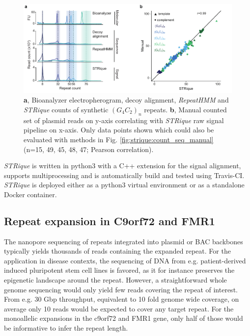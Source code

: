 \begin{figure}[h]
	\centering
	\includegraphics[width=1.0\textwidth]{figures/strique/count_signal_corr.pdf}
	\captionsetup{format=plain}
	\caption[Molecular, sequence and signal based STR evaluation]{\textbf{a}, Bioanalyzer electropherogram, decoy alignment, \textit{RepeatHMM} and \textit{STRique} counts of synthetic $ (G_{4}C_{2})_{n} $ repeats. \textbf{b}, Manual counted set of plasmid reads on y-axis correlating with \textit{STRique} raw signal pipeline on x-axis. Only data points shown which could also be evaluated with methods in Fig. \ref{fig:strique:count_seq_manual} (n=15, 49, 45, 48, 47; Pearson correlation).}
	\label{fig:strique:count_signal_corr}
\end{figure}

\textit{STRique} is written in python3 with a C++ extension for the signal alignment, supports multiprocessing and is automatically build and tested using Travis-CI. \textit{STRique} is deployed either as a python3 virtual environment or as a standalone Docker container.




\subsection{Repeat expansion in C9orf72 and FMR1}
\label{subsec:strique:c9orf72}

The nanopore sequencing of repeats integrated into plasmid or BAC backbones typically yields thousands of reads containing the expanded repeat. For the application in disease contexts, the sequencing of DNA from e.g. patient-derived induced pluripotent stem cell lines is favored, as it for instance preserves the epigenetic landscape around the repeat. However, a straightforward whole genome sequencing would only yield few reads covering the repeat of interest. From e.g. 30 Gbp throughput, equivalent to 10 fold genome wide coverage, on average only 10 reads would be expected to cover any target repeat. For the monoallelic expansions in the c9orf72 and FMR1 gene, only half of those would be informative to infer the repeat length.

